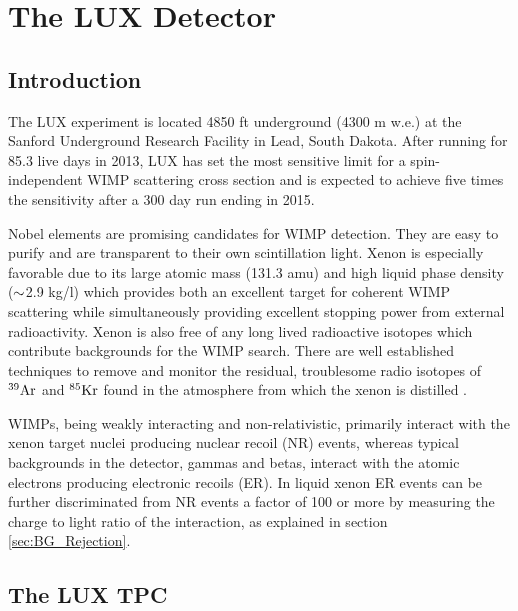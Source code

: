 

\renewcommand{\thechapter}{2}

\chapter{The LUX Detector}
\label{Ch:2}

\section{Introduction}

The LUX experiment is located 4850 ft underground (4300 m w.e.) at the Sanford Underground Research Facility in Lead, South Dakota. After running for 85.3 live days in 2013, LUX has set the most sensitive limit for a spin-independent WIMP scattering cross section \cite{LUX_PRL} and is expected to achieve five times the sensitivity after a 300 day run ending in 2015. 

Nobel elements are promising candidates for WIMP detection. They are easy to purify and are transparent to their own scintillation light. Xenon is especially favorable due to its  large atomic mass (131.3 amu) and high liquid phase density ($\rm \sim$2.9 kg/l) which provides both an excellent target for coherent WIMP scattering while simultaneously providing excellent stopping power from external radioactivity. Xenon is also free of any long lived radioactive isotopes which contribute backgrounds for the WIMP search. There are well established techniques to remove and monitor the residual, troublesome radio isotopes of $\rm ^{39}Ar$ and $\rm^{85}Kr$ found in the atmosphere from which the xenon is distilled \cite{Aprile_LXe_overview} \cite{Kr_ppt_Dobi} \cite{lux_kr_removal} \cite{xmass_kr_removal}.
 
WIMPs, being weakly interacting and non-relativistic, primarily interact with the xenon target nuclei producing nuclear recoil (NR) events, whereas typical backgrounds in the detector, gammas and betas, interact with the atomic electrons producing electronic recoils (ER). In liquid xenon ER events can be further discriminated from NR events a factor of 100 or more by measuring the charge to light ratio of the interaction, as explained in section \ref{sec:BG_Rejection}.


\section{The LUX TPC}

